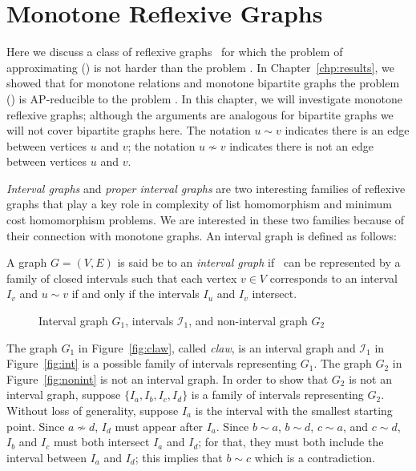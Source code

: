 \chapter{Monotone Reflexive Graphs}
Here we discuss a class of reflexive graphs \mH\ for which the problem of approximating
\chom(\mH) is not harder than the problem \cbis\@.
In Chapter~\ref{chp:results}, we showed that for monotone relations and monotone
bipartite graphs the problem \chom(\mH) is AP-reducible to the problem \cbis\@. In this chapter,
we will investigate monotone reflexive graphs; although the arguments are
analogous for bipartite graphs we will not cover bipartite graphs here.
The notation \(u \sim v\) indicates there is an edge between vertices \(u\) and \(v\);
the notation \(u \not \sim v\) indicates there is not an edge between vertices \(u\) and \(v\)\@.

\emph{Interval graphs} and \emph{proper interval graphs}
are two interesting families of reflexive graphs that play a key role in complexity of 
list homomorphism and minimum cost homomorphism problems. We are interested in these two families
because of their connection with monotone graphs. 
An interval graph is defined as follows:

\begin{defi}
A graph \(G=(V,E)\) is said be to an \emph{interval graph} if \mG\ can
be represented by a family of closed intervals such that
each vertex \(v \in V\) corresponds to an interval \(I_v\) and \(u \sim v\)
if and only if the intervals \(I_u\) and \(I_v\) intersect.
\end{defi}

\begin{figure} [h]
\center
\subfigure[\ensuremath{G_1}]{\label{fig:claw}} \hspace{2cm}
\subfigure[\ensuremath{I_1}]{\label{fig:int}} \hspace{2cm}
\subfigure[\ensuremath{G_2}]{\label{fig:nonint}}
\caption{Interval graph \ensuremath{G_1}, intervals \ensuremath{\mathcal{I}_1}, and non-interval graph \ensuremath{G_2}}
\end{figure}

The graph \(G_1\) in Figure~\ref{fig:claw}, called \emph{claw}, is an interval graph
and \(\mathcal{I}_1\) in Figure~\ref{fig:int} is a possible family of intervals representing \(G_1\)\@.
The graph \(G_2\) in Figure~\ref{fig:nonint} is not an interval graph. In order to show that \(G_2\) is not
an interval graph, suppose \(\{I_a, I_b, I_c, I_d\}\) is a family of intervals representing \(G_2\)\@.
Without loss of generality, suppose \(I_a\) is the interval with the smallest starting point.
Since \(a\not \sim d\), \(I_d\) must appear after \(I_a\)\@. Since \(b\sim a\), \(b\sim d\), \(c\sim a\), and \(c\sim d\),
\(I_b\) and \(I_c\) must both intersect \(I_a\) and \(I_d\); for that, they must both include the interval between
\(I_a\) and \(I_d\); this implies that \(b\sim c\) which is a contradiction.

